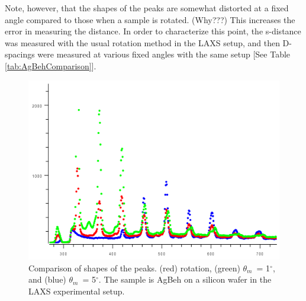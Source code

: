 \documentclass[letterpaper,12pt]{article}
\newcommand{\dg}{$^{\circ}$}%
\newcommand{\motor}{$\theta_m$}%
\begin{document}
Note, however, that the shapes of the peaks are somewhat distorted at a fixed angle compared to those when a sample is rotated. (Why???) This increases the error in measuring the distance. In order to characterize this point, the s-distance was measured with the usual rotation method in the LAXS setup, and then D-spacings were measured at various fixed angles with the same setup [See Table \ref{tab:AgBehComparison}].
\begin{figure}[htbp]
	\centering
	\includegraphics[width=\textwidth]{AgBehComparison}
	\caption[Comparison of shapes of the peaks]{Comparison of shapes of the peaks. (red) rotation, (green) \motor\ = 1\dg, and (blue) \motor\ = 5\dg. The sample is AgBeh on a silicon wafer in the LAXS experimental setup.}
	\label{fig:AgBehComparison}
\end{figure}
\end{document}

